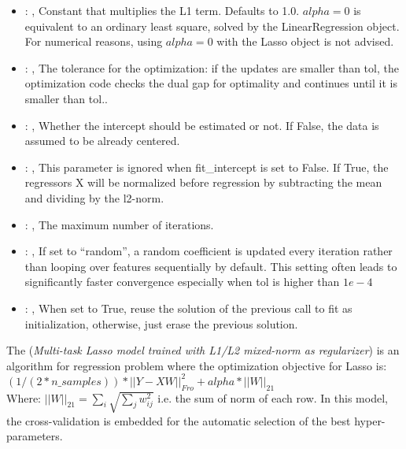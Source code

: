 \begin{itemize}
    \item {}: , 
      Constant that multiplies the L1 term. Defaults to 1.0.
      $alpha = 0$ is equivalent to an ordinary least square, solved by
      the LinearRegression object. For numerical reasons, using $alpha = 0$
      with the Lasso object is not advised.

    \item {}: , 
      The tolerance for the optimization: if the updates are smaller
      than tol, the optimization code checks the dual gap for optimality and
      continues until it is smaller than tol..

    \item {}: , 
      Whether the intercept should be estimated or not. If False,
      the data is assumed to be already centered.

    \item {}: , 
      This parameter is ignored when fit\_intercept is set to False. If True,
      the regressors X will be normalized before regression by subtracting the mean and
      dividing by the l2-norm.

    \item {}: , 
      The maximum number of iterations.

    \item {}: , 
      If set to ``random'', a random coefficient is updated every iteration
      rather than looping over features sequentially by default. This setting
      often leads to significantly faster convergence especially when tol is higher than $1e-4$

    \item {}: , 
      When set to True, reuse the solution of the previous call
      to fit as initialization, otherwise, just erase the previous solution.
  \end{itemize}
 The  (\textit{Multi-task Lasso model trained                         with
 L1/L2 mixed-norm as regularizer}) is an algorithm for regression problem
 where the optimization objective for Lasso is:                         $(1 / (2 * n\_samples)) *
 ||Y - XW||^2_{Fro} + alpha * ||W||_{21}$                         \\Where:
 $||W||_{21} = \sum_i \sqrt{\sum_j w_{ij}^2}$                         i.e. the sum of norm of each
 row.                         In this model, the cross-validation is embedded for the automatic
 selection                         of the best hyper-parameters.

